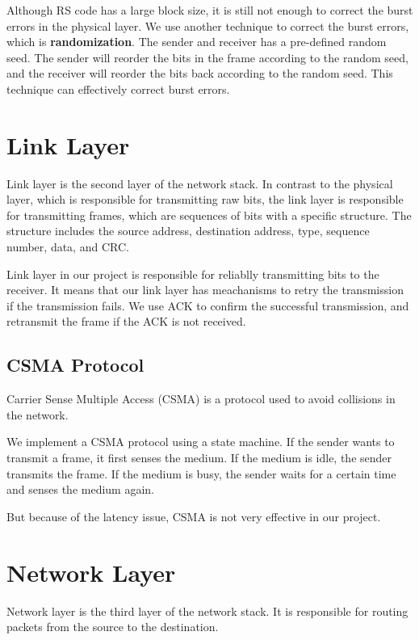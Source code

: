 \documentclass{article}
\begin{document}
Although RS code has a large block size, it is still not enough to correct the burst errors in the physical layer. We use another technique to correct the burst errors, which is \textbf{randomization}. The sender and receiver has a pre-defined random seed. The sender will reorder the bits in the frame according to the random seed, and the receiver will reorder the bits back according to the random seed. This technique can effectively correct burst errors.

\section{Link Layer}

Link layer is the second layer of the network stack.
In contrast to the physical layer, which is responsible for transmitting raw bits, the link layer is responsible for transmitting frames, which are sequences of bits with a specific structure.
The structure includes the source address, destination address, type, sequence number, data, and CRC.

Link layer in our project is responsible for reliablly transmitting bits to the receiver.
It means that our link layer has meachanisms to retry the transmission if the transmission fails. We use ACK to confirm the successful transmission, and retransmit the frame if the ACK is not received.

\subsection{CSMA Protocol}

Carrier Sense Multiple Access (CSMA) is a protocol used to avoid collisions in the network.

We implement a CSMA protocol using a state machine.
If the sender wants to transmit a frame, it first senses the medium.
If the medium is idle, the sender transmits the frame.
If the medium is busy, the sender waits for a certain time and senses the medium again.

But because of the latency issue, CSMA is not very effective in our project.

\section{Network Layer}

Network layer is the third layer of the network stack.
It is responsible for routing packets from the source to the destination.
\end{document}
